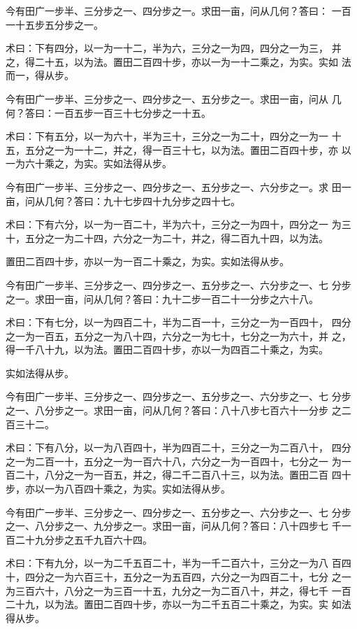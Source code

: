 \documentclass[12pt,UTF8]{ctexbook}
\begin{document}
今有田广一步半、三分步之一、四分步之一。求田一亩，问从几何？答曰： 一百一十五步五分步之一。

术曰：下有四分，以一为一十二，半为六，三分之一为四，四分之一为三， 并之，得二十五，以为法。置田二百四十步，亦以一为一十二乘之，为实。实如 法而一，得从步。

今有田广一步半、三分步之一、四分步之一、五分步之一。求田一亩，问从 几何？答曰：一百五步一百三十七分步之一十五。

术曰：下有五分，以一为六十，半为三十，三分之一为二十，四分之一为一 十五，五分之一为一十二，并之，得一百三十七，以为法。置田二百四十步，亦 以一为六十乘之，为实。实如法得从步。

今有田广一步半、三分步之一、四分步之一、五分步之一、六分步之一。求 田一亩，问从几何？答曰：九十七步四十九分步之四十七。

术曰：下有六分，以一为一百二十，半为六十，三分之一为四十，四分之一 为三十，五分之一为二十四，六分之一为二十，并之，得二百九十四，以为法。

置田二百四十步，亦以一为一百二十乘之，为实。实如法得从步。

今有田广一步半、三分步之一、四分步之一、五分步之一、六分步之一、七 分步之一。求田一亩，问从几何？答曰：九十二步一百二十一分步之六十八。

术曰：下有七分，以一为四百二十，半为二百一十，三分之一为一百四十， 四分之一为一百五，五分之一为八十四，六分之一为七十，七分之一为六十，并 之，得一千八十九，以为法。置田二百四十步，亦以一为四百二十乘之，为实。

实如法得从步。

今有田广一步半、三分步之一、四分步之一、五分步之一、六分步之一、七 分步之一、八分步之一。求田一亩，问从几何？答曰：八十八步七百六十一分步 之二百三十二。

术曰：下有八分，以一为八百四十，半为四百二十，三分之一为二百八十， 四分之一为二百一十，五分之一为一百六十八，六分之一为一百四十，七分之一 为一百二十，八分之一为一百五，并之，得二千二百八十三，以为法。置田二百 四十步，亦以一为八百四十乘之，为实。实如法得从步。

今有田广一步半、三分步之一、四分步之一、五分步之一、六分步之一、七 分步之一、八分步之一、九分步之一。求田一亩，问从几何？答曰：八十四步七 千一百二十九分步之五千九百六十四。

术曰：下有九分，以一为二千五百二十，半为一千二百六十，三分之一为八 百四十，四分之一为六百三十，五分之一为五百四，六分之一为四百二十，七分 之一为三百六十，八分之一为三百一十五，九分之一为二百八十，并之，得七千 一百二十九，以为法。置田二百四十步，亦以一为二千五百二十乘之，为实。实 如法得从步。
\end{document}
